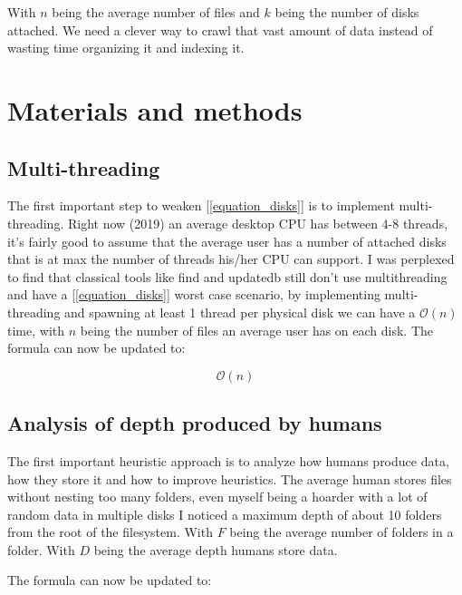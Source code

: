 \documentclass{article}
\newcommand{\bigO}{\mathcal{O}}
\begin{document}
With $n$ being the average number of files and $k$ being the number of disks attached.
We need a clever way to crawl that vast amount of data instead of wasting time organizing it and indexing it.

\section{Materials and methods}

\subsection{Multi-threading}
The first important step to weaken [\ref{equation_disks}] is to implement multi-threading.
Right now (2019) an average desktop CPU has between 4-8 threads, it's fairly good to assume that the average user has a number of attached disks that is at max the number of threads his/her CPU can support.
I was perplexed to find that classical tools like find and updatedb still don't use multithreading and have a [\ref{equation_disks}] worst case scenario, by implementing multi-threading and spawning at least 1 thread per physical disk we can have a $\bigO(n)$ time, with $n$ being the number of files an average user has on each disk.
The formula can now be updated to:

\begin{equation}
    \label{equation_multithreading}
    \bigO(n)
\end{equation}



\subsection{Analysis of depth produced by humans}

The first important heuristic approach is to analyze how humans produce data, how they store it and how to improve heuristics.
The average human stores files without nesting too many folders, even myself being a hoarder with a lot of random data in multiple disks I noticed a maximum depth of about 10 folders from the root of the filesystem.
With $F$ being the average number of folders in a folder.
With $D$ being the average depth humans store data.

The formula can now be updated to:
\end{document}
